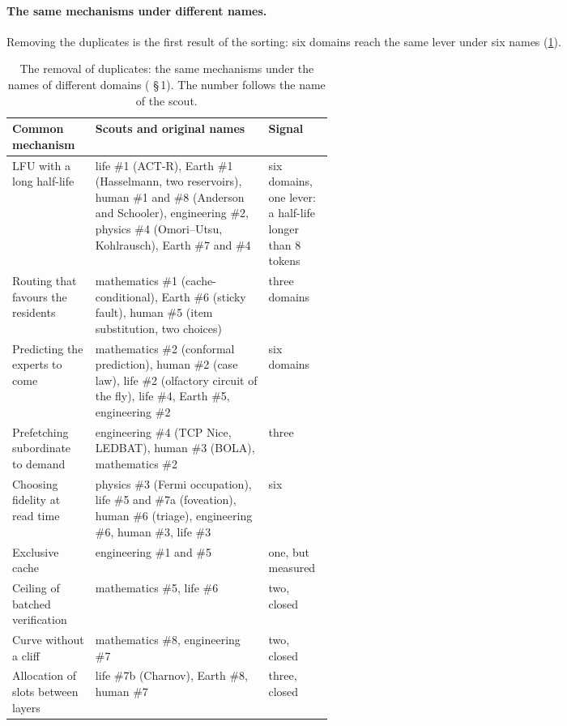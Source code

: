\paragraph{The same mechanisms under different names.} Removing the duplicates is the first result of the sorting: six domains reach the same lever under six names (\cref{t3mim:tab:doublons}).

\begin{table}[tbp]
\centering\small
\caption[The removal of duplicate candidates]{The removal of duplicates: the same mechanisms under the names of different domains ( §\,1). The number follows the name of the scout.}
\label{t3mim:tab:doublons}
\renewcommand{\arraystretch}{1.12}
\begin{tabularx}{\linewidth}{@{}>{\raggedright\arraybackslash}p{0.26\linewidth}>{\raggedright\arraybackslash}X>{\raggedright\arraybackslash}p{0.2\linewidth}@{}}
\toprule
Common mechanism & Scouts and original names & Signal \\
\midrule
LFU with a long half-life & life \#1 (ACT-R), Earth \#1 (Hasselmann, two reservoirs), human \#1 and \#8 (Anderson and Schooler), engineering \#2, physics \#4 (Omori--Utsu, Kohlrausch), Earth \#7 and \#4 & six domains, one lever: a half-life longer than 8 tokens \\
Routing that favours the residents & mathematics \#1 (cache-conditional), Earth \#6 (sticky fault), human \#5 (item substitution, two choices) & three domains \\
Predicting the experts to come & mathematics \#2 (conformal prediction), human \#2 (case law), life \#2 (olfactory circuit of the fly), life \#4, Earth \#5, engineering \#2 & six domains \\
Prefetching subordinate to demand & engineering \#4 (TCP Nice, LEDBAT), human \#3 (BOLA), mathematics \#2 & three \\
Choosing fidelity at read time & physics \#3 (Fermi occupation), life \#5 and \#7a (foveation), human \#6 (triage), engineering \#6, human \#3, life \#3 & six \\
Exclusive cache & engineering \#1 and \#5 & one, but measured \\
Ceiling of batched verification & mathematics \#5, life \#6 & two, closed \\
Curve without a cliff & mathematics \#8, engineering \#7 & two, closed \\
Allocation of slots between layers & life \#7b (Charnov), Earth \#8, human \#7 & three, closed \\
\bottomrule
\end{tabularx}
\end{table}

